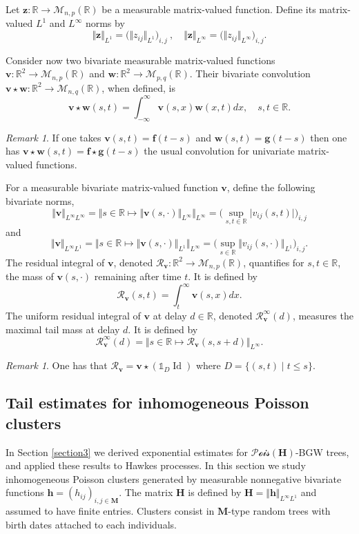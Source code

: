 \documentclass[reqno,final,11pt]{amsart}
\theoremstyle{plain}
\theoremstyle{definition}
\theoremstyle{remark}
\newtheorem{remark}[theorem]{Remark}
\newcommand{\R}{\mathds{R}}
\newcommand{\ind}{\mathds{1}}
\newcommand{\itg}{\displaystyle\int}
\newcommand{\M}{\bm{M}}
\newcommand{\h}{\bm{h}}
\renewcommand{\H}{\bm{H}}
\newcommand{\Vone}[1]{\Vert #1 \Vert_{L^1}}
\newcommand{\Vity}[1]{\Vert #1 \Vert_{L^{\infty}}}
\newcommand{\Vityty}[1]{\Vert #1 \Vert_{L^{\infty}L^{\infty}}}
\newcommand{\Vityone}[1]{\Vert #1 \Vert_{L^{\infty}L^{1}}}
\newcommand{\Pois}{\mathscr{P}\!\mathscr{o}\!\mathscr{i}\!\mathscr{s}}
\newcommand{\Res}{\mathcal{R}}
\DeclareMathOperator{\Id}{Id}
\begin{document}
Let $\bm{z}:\R \to \mathcal{M}_{n,p}(\R)$ be a measurable matrix-valued function. Define its matrix-valued $L^1$ and $L^\infty$ norms by
\[\Vone{\bm{z}} = \big(\Vone{z_{ij}}\big)_{i,j} \ , \quad \Vity{\bm{z}} = \big(\Vity{z_{ij}}\big)_{i,j}.\]

Consider now two bivariate measurable matrix-valued functions $\bm{v}:\R^2 \to \mathcal{M}_{n,p}(\R)$ and $\bm{w} : \R^2 \to \mathcal{M}_{p,q}(\R)$. Their bivariate convolution $\bm{v} \star \bm{w} : \R^2 \to \mathcal{M}_{n,q}(\R)$, when defined, is
\[\bm{v} \star \bm{w}(s,t) = \itg_{-\infty}^{\infty} \bm{v}(s,x) \bm{w}(x,t)dx, \quad s,t\in\R.\]
\begin{remark}
	If one takes $\bm{v}(s,t) = \bm{f}(t-s)$ and $\bm{w}(s,t) = \bm{g}(t-s)$ then one has $\bm{v} \star \bm{w}(s,t) = \bm{f} \star \bm{g}(t-s)$ the usual convolution for univariate matrix-valued functions.
\end{remark}

For a measurable bivariate matrix-valued function $\bm{v}$, define the following bivariate norms,
\[\Vityty{\bm{v}} = \Vity{ s\in\R\mapsto \Vity{\bm{v}(s,\cdot)}} = \big( \sup_{s,t \in\R} \vert v_{ij}(s,t)\vert\big)_{i,j}\]
and
\[ \Vityone{\bm{v}} = \Vity{s\in\R\mapsto \Vone{\bm{v}(s,\cdot)}} = \big(\sup_{s\in\R} \Vone{v_{ij}(s,\cdot)}\big)_{i,j}.\]
The residual integral of $\bm{v}$, denoted $\Res_{\bm{v}}:\R^2 \to \mathcal{M}_{n,p}(\R)$, quantifies for $s,t\in\R$, the mass of $\bm{v}(s,\cdot)$ remaining after time $t$. It is defined by
\[\Res_{\bm{v}}(s,t) = \itg_t^{\infty} \bm{v}(s,x)dx.\]
The uniform residual integral of $\bm{v}$ at delay $d \in\R$, denoted $\Res^\infty_{\bm{v}}(d)$, measures the maximal tail mass at delay $d$. It is defined by 
\[\Res^{\infty}_{\bm{v}}(d) = \Vert s\in\R \mapsto \Res_{\bm{v}}(s,s+d)\Vert_{L^{\infty}}.\]

\begin{remark}
	One has that $\Res_{\bm{v}} = \bm{v} \star (\ind_{D} \Id)$ where $D = \{(s,t) \mid t\leq s\}$.
\end{remark}

\subsection{Tail estimates for inhomogeneous Poisson clusters}

In Section \ref{section3} we derived exponential estimates for $\Pois(\H)$-BGW trees, and applied these results to Hawkes processes. In this section we study inhomogeneous Poisson clusters generated by measurable nonnegative bivariate functions $\h = (h_{ij})_{i,j\in\M}$. The matrix $\H$ is defined by $\H = \Vityone{\h}$ and assumed to have finite entries. Clusters consist in $\M$-type random trees with birth dates attached to each individuals. 
\end{document}
